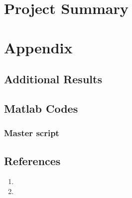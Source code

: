 \documentclass{report}
\begin{document}
\chapter{Project Summary}


%                

\newpage
\chapter{Appendix}
\section{Additional Results}
\section{Matlab Codes}
\subsection{Master script}
%
\section{References}
\begin{enumerate}
\item 
\item
\end{enumerate}
\end{document}
